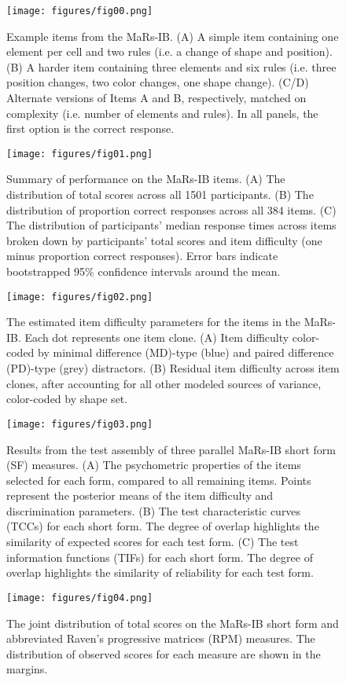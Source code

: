 \documentclass[a4paper,man,natbib]{apa6}
\begin{document}
\begin{figure}
\centering
\texttt{[image: figures/fig00.png]}
\caption{\label{fig:fig00} Example items from the MaRs-IB. (A) A simple item containing one element per cell and two rules (i.e. a change of shape and position). (B) A harder item containing three elements and six rules (i.e. three position changes, two color changes, one shape change). (C/D) Alternate versions of Items A and B, respectively, matched on complexity (i.e. number of elements and rules). In all panels, the first option is the correct response.}
\end{figure}

\begin{figure}
\centering
\texttt{[image: figures/fig01.png]}
\caption{\label{fig:fig01}Summary of performance on the MaRs-IB items. (A) The distribution of total scores across all 1501 participants. (B) The distribution of proportion correct responses across all 384 items. (C) The distribution of participants' median response times across items broken down by participants' total scores and item difficulty (one minus proportion correct responses). Error bars indicate bootstrapped 95\% confidence intervals around the mean.}
\end{figure}

\begin{figure}
\centering
\texttt{[image: figures/fig02.png]}
\caption{\label{fig:fig02} The estimated item difficulty parameters for the items in the MaRs-IB. Each dot represents one item clone. (A) Item difficulty color-coded by minimal difference (MD)-type (blue) and paired difference (PD)-type (grey) distractors. (B) Residual item difficulty across item clones, after accounting for all other modeled sources of variance, color-coded by shape set.}
\end{figure}
 
\begin{figure}
\centering
\texttt{[image: figures/fig03.png]}
\caption{\label{fig:fig03}Results from the test assembly of three parallel MaRs-IB short form (SF) measures. (A) The psychometric properties of the items selected for each form, compared to all remaining items. Points represent the posterior means of the item difficulty and discrimination  parameters. (B) The test characteristic curves (TCCs) for each short form. The degree of overlap highlights the similarity of expected scores for each test form. (C) The test information functions (TIFs) for each short form. The degree of overlap highlights the similarity of reliability for each test form.}
\end{figure}

\begin{figure}
\centering
\texttt{[image: figures/fig04.png]}
\caption{\label{fig:fig04}The joint distribution of total scores on the MaRs-IB short form and abbreviated Raven's progressive matrices (RPM) measures. The distribution of observed scores for each measure are shown in the margins.}
\end{figure}
\end{document}
